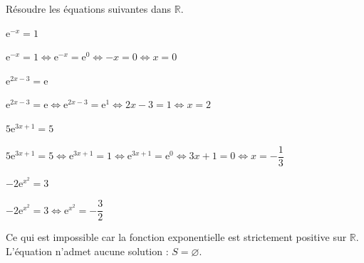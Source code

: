 \documentclass[11pt,a4paper]{article}  %
\begin{document}

Résoudre les équations suivantes dans $\mathbb{R}$.
\begin{enumMet}
	\item $\mathrm{e}^{-x}=1$
	\begin{corrBox}
		$\mathrm{e}^{-x}=1 \Leftrightarrow \mathrm{e}^{-x}=\mathrm{e}^{0} \Leftrightarrow-x=0 \Leftrightarrow x=0$		
	\end{corrBox}
	\item $\mathrm{e}^{2 x-3}=\mathrm{e}$
	\begin{corrBox}
		$\mathrm{e}^{2 x-3}=\mathrm{e} \Leftrightarrow \mathrm{e}^{2 x-3}=\mathrm{e}^{1} \Leftrightarrow 2 x-3=1 \Leftrightarrow x=2$		
	\end{corrBox}
	\item $5 \mathrm{e}^{3 x+1}=5$
	\begin{corrBox}
		$5 \mathrm{e}^{3 x+1}=5 \Leftrightarrow \mathrm{e}^{3 x+1}=1 \Leftrightarrow \mathrm{e}^{3 x+1}=\mathrm{e}^{0} \Leftrightarrow 3 x+1=0 \Leftrightarrow x=-\dfrac{1}{3}$
	\end{corrBox}
	\item $-2 \mathrm{e}^{x^2}=3$
	\begin{corrBox}
		$-2 \mathrm{e}^{x^{2}}=3 \Leftrightarrow \mathrm{e}^{x^{2}}=-\dfrac{3}{2}$
		
		Ce qui est impossible car la fonction exponentielle est strictement positive sur $\mathbb{R}$. L'équation n'admet aucune solution : $S=\varnothing$.		
	\end{corrBox}
\end{enumMet}

\end{document}
